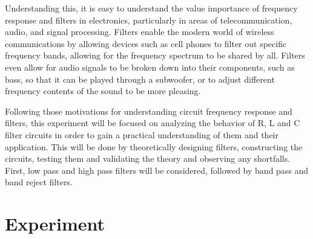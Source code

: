 \documentclass[12pt]{article}
\begin{document}
Understanding this, it is easy to understand the value importance of frequency response and filters in electronics, particularly in areas of telecommunication, audio, and signal processing. Filters enable the modern world of wireless communications by allowing devices such as cell phones to filter out specific frequency bands, allowing for the frequency spectrum to be shared by all. Filters even allow for audio signals to be broken down into their components, such as bass, so that it can be played through a subwoofer, or to adjust different frequency contents of the sound to be more pleasing.

Following those motivations for understanding circuit frequency response and filters, this experiment will be focused on analyzing the behavior of R, L and C filter circuits in order to gain a practical understanding of them and their application. This will be done by theoretically designing filters, constructing the circuits, testing them and validating the theory and observing any shortfalls. First, low pass and high pass filters will be considered, followed by band pass and band reject filters.
\FloatBarrier

\section{Experiment}
\end{document}
